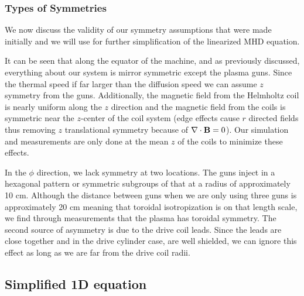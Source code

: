 \subsubsection{Types of Symmetries}

We now discuss the validity of our symmetry assumptions that were made initially and we will use for further simplification of the linearized MHD equation.


It can be seen that along the equator of the machine, and as previously discussed, everything about our system is mirror symmetric except the plasma guns. Since the thermal speed if far larger than the diffusion speed we can assume $z$ symmetry from the guns. Additionally, the magnetic field from the Helmholtz coil is nearly uniform along the $z$ direction and the magnetic field from the coils is symmetric near the $z$-center of the coil system (edge effects cause $r$ directed fields thus removing $z$ translational symmetry because of $\nabla \cdot \vb{B} = 0$). Our simulation and measurements are only done at the mean $z$ of the coils to minimize these effects.


In the $\phi$ direction, we lack symmetry at two locations. The guns inject in a hexagonal pattern or symmetric subgroups of that at a radius of approximately 10 cm. Although the distance between guns when we are only using three guns is approximately 20 cm meaning that toroidal isotropization is on that length scale, we find through measurements that the plasma has toroidal symmetry. The second source of asymmetry is due to the drive coil leads. Since the leads are close together and in the drive cylinder case, are well shielded, we can ignore this effect as long as we are far from the drive coil radii.

\subsection{Simplified 1D equation}

